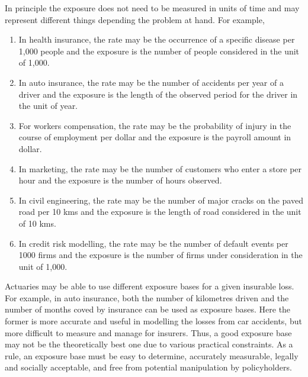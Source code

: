 \documentclass[12pt]{article}
\begin{document}
 In principle the exposure does not need to be measured in units of time and may represent different things depending the problem at hand. For example,
\begin{enumerate}
  \item  In health insurance, the rate may be the occurrence of a specific disease per 1,000 people and the exposure is the number of people considered in the unit of 1,000.
    \item  In auto insurance, the rate may be the number of accidents per year of a driver and the exposure is the length of the observed period for the driver in the unit of year.
\item For workers compensation, the rate may be the probability of injury in the course of employment per dollar and the exposure is the payroll amount in dollar.
  \item In marketing, the rate may be  the number of customers who enter a store per hour and the exposure is the number of hours observed.
  \item In civil engineering, the rate may be  the number of major cracks on the paved road per 10 kms and the exposure is the length of road considered in the unit of 10 kms.
  \item In credit risk modelling, the rate may be the number of default events per 1000 firms and the exposure is the number of firms under consideration in the unit of 1,000.
\end{enumerate}
Actuaries may be able to use different exposure bases for a given insurable loss. For example, in auto insurance, both the number of kilometres driven and the number of months coved by insurance can be used as exposure bases. Here the former is more accurate and useful in modelling the losses from car accidents, but more difficult to measure and manage for insurers. Thus, a good exposure base  may not be the theoretically  best one due to various practical constraints. As a rule, an exposure base must be easy to determine, accurately measurable, legally and socially acceptable, and free from potential manipulation by policyholders. \\
\end{document}
